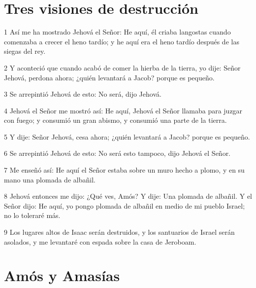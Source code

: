 \section*{Tres visiones de destrucción}

\par 1 Así me ha mostrado Jehová el Señor: He aquí, él criaba langostas cuando comenzaba a crecer el heno tardío; y he aquí era el heno tardío después de las siegas del rey.
\par 2 Y aconteció que cuando acabó de comer la hierba de la tierra, yo dije: Señor Jehová, perdona ahora; ¿quién levantará a Jacob? porque es pequeño.
\par 3 Se arrepintió Jehová de esto: No será, dijo Jehová.
\par 4 Jehová el Señor me mostró así: He aquí, Jehová el Señor llamaba para juzgar con fuego; y consumió un gran abismo, y consumió una parte de la tierra.
\par 5 Y dije: Señor Jehová, cesa ahora; ¿quién levantará a Jacob? porque es pequeño.
\par 6 Se arrepintió Jehová de esto: No será esto tampoco, dijo Jehová el Señor.
\par 7 Me enseñó así: He aquí el Señor estaba sobre un muro hecho a plomo, y en su mano una plomada de albañil.
\par 8 Jehová entonces me dijo: ¿Qué ves, Amós? Y dije: Una plomada de albañil. Y el Señor dijo: He aquí, yo pongo plomada de albañil en medio de mi pueblo Israel; no lo toleraré más.
\par 9 Los lugares altos de Isaac serán destruidos, y los santuarios de Israel serán asolados, y me levantaré con espada sobre la casa de Jeroboam.

\section*{Amós y Amasías}

